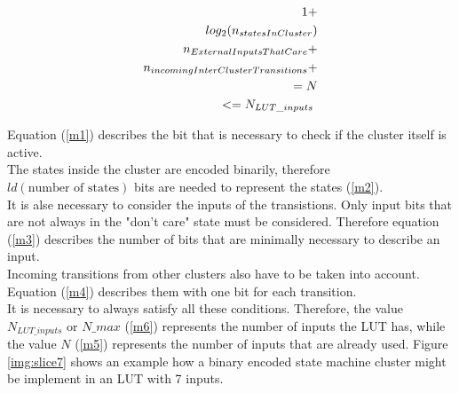 \begin{center}
\begin{eqnarray}
1\vspace{1cm} \label{m1}+\\
log_2(n_{statesInCluster}) \label{m2} \\
n_{ExternalInputsThatCare} \label{m3}+ \\
n_{incomingInterClusterTransitions} \label{m4}+ \\
= N \label{m5}\\
<= N_{LUT\_inputs} \label{m6}\
\end{eqnarray}
\end{center}

Equation (\ref{m1}) describes the bit that is necessary to check if the cluster itself is active.\\
The states inside the cluster are encoded binarily, therefore $ld(\text{number of states})$ bits are needed to represent the states (\ref{m2}). \\
It is alse necessary to consider the inputs of the transistions. Only input bits that are not always in the "don't care" state must be considered. Therefore equation (\ref{m3}) describes the number of bits that are minimally necessary to describe an input. \\
Incoming transitions from other clusters also have to be taken into account. Equation (\ref{m4}) describes them with one bit for each transition. \\

It is necessary to always satisfy all these conditions. Therefore, the value $N_{LUT\_inputs}$ or $N\_max$ (\ref{m6}) represents the number of inputs the LUT has, while the value $N$ (\ref{m5}) represents the number of inputs that are already used.
Figure \ref{img:slice7} shows an example how a binary encoded state machine cluster might be implement in an LUT with 7 inputs.


